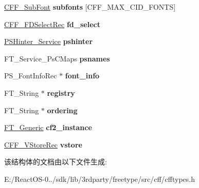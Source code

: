 \begin{DoxyCompactItemize}
\hyperlink{struct_c_f_f___sub_font_rec__}{C\+F\+F\+\_\+\+Sub\+Font} {\bfseries subfonts} \mbox{[}C\+F\+F\+\_\+\+M\+A\+X\+\_\+\+C\+I\+D\+\_\+\+F\+O\+N\+TS\mbox{]}
\item 
\mbox{\label{struct_c_f_f___font_rec___a91a0f13516ff978c498355205c639342}} 
\hyperlink{struct_c_f_f___f_d_select_rec__}{C\+F\+F\+\_\+\+F\+D\+Select\+Rec} {\bfseries fd\+\_\+select}
\item 
\mbox{\label{struct_c_f_f___font_rec___aec2f775cc0810d730bb208444e58aa0d}} 
\hyperlink{struct_p_s_hinter___interface__}{P\+S\+Hinter\+\_\+\+Service} {\bfseries pshinter}
\item 
\mbox{\label{struct_c_f_f___font_rec___a2d136551bc9f8c4bcb1b99a284bd0211}} 
F\+T\+\_\+\+Service\+\_\+\+Ps\+C\+Maps {\bfseries psnames}
\item 
\mbox{\label{struct_c_f_f___font_rec___aef0c3f15cb298c702c4a04a7f7881fb5}} 
P\+S\+\_\+\+Font\+Info\+Rec $\ast$ {\bfseries font\+\_\+info}
\item 
\mbox{\label{struct_c_f_f___font_rec___ac3fa8d36da65d400e3cf5196e4f1195f}} 
F\+T\+\_\+\+String $\ast$ {\bfseries registry}
\item 
\mbox{\label{struct_c_f_f___font_rec___ae6f4261f8f4b5b3a87fa96dd0cb235da}} 
F\+T\+\_\+\+String $\ast$ {\bfseries ordering}
\item 
\mbox{\label{struct_c_f_f___font_rec___a547fb16af030ff0c7494c2db5749e486}} 
\hyperlink{struct_f_t___generic__}{F\+T\+\_\+\+Generic} {\bfseries cf2\+\_\+instance}
\item 
\mbox{\label{struct_c_f_f___font_rec___a7b4182793a28cea4e7a42bfc931e113d}} 
\hyperlink{struct_c_f_f___v_store_rec__}{C\+F\+F\+\_\+\+V\+Store\+Rec} {\bfseries vstore}
\end{DoxyCompactItemize}


该结构体的文档由以下文件生成\+:\begin{DoxyCompactItemize}
\item 
E\+:/\+React\+O\+S-\/0../sdk/lib/3rdparty/freetype/src/cff/cfftypes.\+h\end{DoxyCompactItemize}

